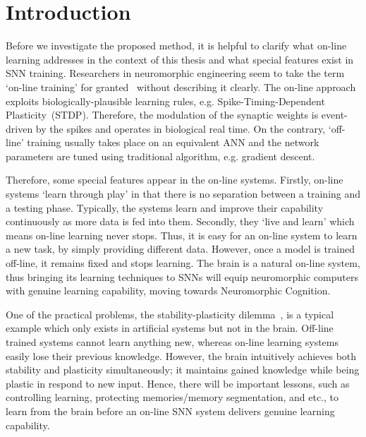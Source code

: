 \section{Introduction}
\label{sec:SRM_intro}
Before we investigate the proposed method, it is helpful to clarify what on-line learning addresses in the context of this thesis and what special features exist in SNN training.
Researchers in neuromorphic engineering seem to take the term `on-line training' for granted~\citep{neil2013online,neftci2013event} without describing it clearly.
The on-line approach exploits biologically-plausible learning rules, e.g. Spike-Timing-Dependent Plasticity~(STDP).
Therefore, the modulation of the synaptic weights is event-driven by the spikes and operates in biological real time.
On the contrary, `off-line' training usually takes place on an equivalent ANN and the network parameters are tuned using traditional algorithm, e.g. gradient descent.

Therefore, some special features appear in the on-line systems.
Firstly, on-line systems `learn through play' in that there is no separation between a training and a testing phase.
Typically, the systems learn and improve their capability continuously as more data is fed into them.
Secondly, they `live and learn' which means on-line learning never stops.
Thus, it is easy for an on-line system to learn a new task, by simply providing different data.
However, once a model is trained off-line, it remains fixed and stops learning.
The brain is a natural on-line system, thus bringing its learning techniques to SNNs will equip neuromorphic computers with genuine learning capability, moving towards Neuromorphic Cognition.

One of the practical problems, the stability-plasticity dilemma~\citep{grossberg1987competitive}, is a typical example which only exists in artificial systems but not in the brain.
Off-line trained systems cannot learn anything new, whereas on-line learning systems easily lose their previous knowledge.
However, the brain intuitively achieves both stability and plasticity simultaneously; it maintains gained knowledge while being plastic in respond to new input.
Hence,  there will be important lessons, such as controlling learning, protecting memories/memory segmentation, and etc., to learn from the brain before an on-line SNN system delivers genuine learning capability.


